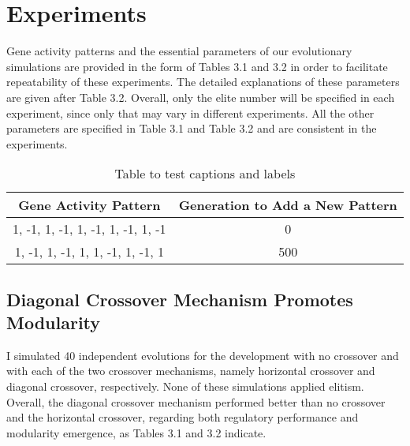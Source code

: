 \section{Experiments}
Gene activity patterns and the essential parameters of our evolutionary simulations are provided in the form of Tables 3.1 and 3.2 in order to facilitate repeatability of these experiments. The detailed explanations of these parameters are given after Table 3.2. Overall, only the elite number will be specified in each experiment, since only that may vary in different experiments. All the other parameters are specified in Table 3.1 and Table 3.2 and are consistent in the experiments. 
\begin{table}[h!]
	\centering
	\caption{Table to test captions and labels}
	\label{table:X}
	\begin{tabular}{||c | c||} 
		\hline
		Gene Activity Pattern & Generation to Add a New Pattern \\ [0.5ex] 
		\hline\hline
		1, -1, 1, -1, 1, -1, 1, -1, 1, -1 & 0 \\ 
		\hline
		1, -1, 1, -1, 1, 1, -1, 1, -1, 1 & 500 \\
		\hline
	\end{tabular}
\end{table}


\subsection{Diagonal Crossover Mechanism Promotes Modularity}
I simulated 40 independent evolutions for the development with no crossover and with each of the two crossover mechanisms, namely horizontal crossover and diagonal crossover, respectively. None of these simulations applied elitism. Overall, the diagonal crossover mechanism performed better than no crossover and the horizontal crossover, regarding both regulatory performance and modularity emergence, as Tables 3.1 and 3.2 indicate.

